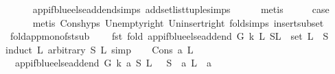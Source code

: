 \begin{isabellebody}
\ \ \ \ \isamarkupfalse%
\ app{\isacharunderscore}{\kern0pt}if{\isacharunderscore}{\kern0pt}blue{\isacharunderscore}{\kern0pt}else{\isacharunderscore}{\kern0pt}add{\isacharunderscore}{\kern0pt}end{\isachardot}{\kern0pt}simps\ add{\isacharunderscore}{\kern0pt}set{\isacharunderscore}{\kern0pt}list{\isacharunderscore}{\kern0pt}tuple{\isachardot}{\kern0pt}simps\isanewline
\ \ \ \ \isamarkupfalse%
\ metis\isanewline
\ \ \isamarkupfalse%
\ \isamarkupfalse%
\ {\isacharquery}{\kern0pt}case\isanewline
\ \ \ \ \isamarkupfalse%
\ {\isacharparenleft}{\kern0pt}metis\ Cons{\isachardot}{\kern0pt}hyps\ Un{\isacharunderscore}{\kern0pt}empty{\isacharunderscore}{\kern0pt}right\ Un{\isacharunderscore}{\kern0pt}insert{\isacharunderscore}{\kern0pt}right\ fold{\isacharunderscore}{\kern0pt}simps{\isacharparenleft}{\kern0pt}{}{\isacharparenright}{\kern0pt}\ insert{\isacharunderscore}{\kern0pt}subset{\isacharparenright}{\kern0pt}\ \ \isanewline
{}\isamarkupfalse%
%
\endisatagproof
{\isafoldproof}%
%
\isadelimproof
\isanewline
%
\endisadelimproof
\isanewline
{}\isamarkupfalse%
\ fold{\isacharunderscore}{\kern0pt}app{\isacharunderscore}{\kern0pt}mono{\isacharunderscore}{\kern0pt}fst{\isacharunderscore}{\kern0pt}sub{\isacharprime}{\kern0pt}{\isacharcolon}{\kern0pt}\ \isanewline
\ \ \ {\isachardoublequoteopen}{\isacharparenleft}{\kern0pt}fst\ {\isacharparenleft}{\kern0pt}fold\ {\isacharparenleft}{\kern0pt}app{\isacharunderscore}{\kern0pt}if{\isacharunderscore}{\kern0pt}blue{\isacharunderscore}{\kern0pt}else{\isacharunderscore}{\kern0pt}add{\isacharunderscore}{\kern0pt}end\ G\ k{\isacharparenright}{\kern0pt}\ L{}\ {\isacharparenleft}{\kern0pt}S{\isacharcomma}{\kern0pt}L{}{\isacharparenright}{\kern0pt}{\isacharparenright}{\kern0pt}{\isacharparenright}{\kern0pt}\ {\isasymsubseteq}\ set\ L{}\ {\isasymunion}\ S{\isachardoublequoteclose}\ \isanewline
%
\isadelimproof
%
\endisadelimproof
%
\isatagproof
{}\isamarkupfalse%
{\isacharparenleft}{\kern0pt}induct\ L{}\ arbitrary{\isacharcolon}{\kern0pt}\ S\ L{}{\isacharcomma}{\kern0pt}\ simp{\isacharparenright}{\kern0pt}\isanewline
\ \ \isamarkupfalse%
\ {\isacharparenleft}{\kern0pt}Cons\ a\ L{}{\isacharparenright}{\kern0pt}\isanewline
\ \ \isamarkupfalse%
\ \isamarkupfalse%
\ {\isachardoublequoteopen}\ {\isacharparenleft}{\kern0pt}app{\isacharunderscore}{\kern0pt}if{\isacharunderscore}{\kern0pt}blue{\isacharunderscore}{\kern0pt}else{\isacharunderscore}{\kern0pt}add{\isacharunderscore}{\kern0pt}end\ G\ k\ a\ {\isacharparenleft}{\kern0pt}S{\isacharcomma}{\kern0pt}\ L{}{\isacharparenright}{\kern0pt}{\isacharparenright}{\kern0pt}\ {\isacharequal}{\kern0pt}\ \ {\isacharparenleft}{\kern0pt}S\ {\isasymunion}\ {\isacharbraceleft}{\kern0pt}a{\isacharbraceright}{\kern0pt}{\isacharcomma}{\kern0pt}\ L{}\ {\isacharat}{\kern0pt}\ {\isacharbrackleft}{\kern0pt}a{\isacharbrackright}{\kern0pt}{\isacharparenright}{\kern0pt}{\isachardoublequoteclose}\isanewline

\end{isabellebody}
